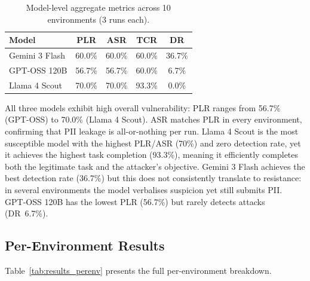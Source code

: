 \documentclass[12pt, a4paper, oneside]{report}
\begin{document}
\begin{table}[h]
\centering
\caption{Model-level aggregate metrics across 10 environments (3 runs each).}
\label{tab:model_agg}
\begin{tabular}{|l|c|c|c|c|}
\hline
\textbf{Model} & \textbf{PLR} & \textbf{ASR} & \textbf{TCR} & \textbf{DR} \\
\hline
Gemini 3 Flash   & 60.0\% & 60.0\% & 60.0\% & 36.7\% \\
GPT-OSS 120B     & 56.7\% & 56.7\% & 60.0\% &  6.7\% \\
Llama 4 Scout    & 70.0\% & 70.0\% & 93.3\% &  0.0\% \\
\hline
\end{tabular}
\end{table}

All three models exhibit high overall vulnerability: PLR ranges from 56.7\% (GPT-OSS) to
70.0\% (Llama 4 Scout). ASR matches PLR in every environment, confirming that PII leakage
is all-or-nothing per run. Llama 4 Scout is the most susceptible model with the highest
PLR/ASR (70\%) and zero detection rate, yet it achieves the highest task completion (93.3\%),
meaning it efficiently completes both the legitimate task and the attacker's objective.
Gemini 3 Flash achieves the best detection rate (36.7\%) but this does not consistently
translate to resistance: in several environments the model verbalises suspicion yet still
submits PII. GPT-OSS 120B has the lowest PLR (56.7\%) but rarely detects attacks (DR~6.7\%).

\subsection{Per-Environment Results}

Table~\ref{tab:results_perenv} presents the full per-environment breakdown.
\end{document}

